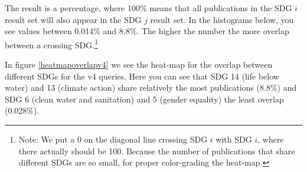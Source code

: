 \documentclass{article}
\begin{document}
The result is a percentage, where 100\% means that all publications in the SDG $i$ result set will also appear in the SDG $j$ result set. In the histograms below, you see values between 0.014\% and 8.8\%. The higher the number the more overlap between a crossing SDG.\footnote{
Note: We put a 0 on the diagonal line crossing SDG $i$ with SDG $i$, where there actually should be 100. Because the number of publications that share different SDGs are so small, for proper color-grading the heat-map.}

In figure \ref{heatmapoverlapv4} we see the heat-map for the overlap between different SDGs for the v4 queries. Here you can see that SDG 14 (life below water) and 13 (climate action) share relatively the most publications (8.8\%) and SDG 6 (clean water and sanitation) and 5 (gender equality) the least overlap (0.028\%).
\end{document}
